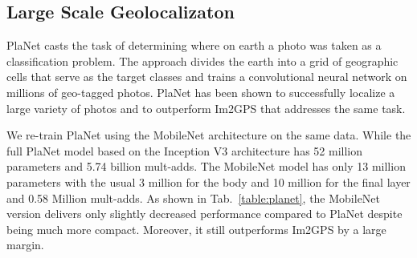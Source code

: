 \documentclass[10pt,twocolumn,letterpaper]{article}
\begin{document}
\subsection{Large Scale Geolocalizaton}
%
\begin{table}[t]
\setlength\tabcolsep{3pt}
  \caption{Performance of PlaNet using the MobileNet architecture. Percentages are the fraction of the Im2GPS test dataset that were localized within a certain distance from the ground truth. The numbers for the original PlaNet model are based on an updated version that has an improved architecture and training dataset.} %
\centering %
\end{table}
%
PlaNet \cite{weyand2016planet} casts the task of determining where on earth a photo was taken as a classification problem. The approach divides the earth into a grid of geographic cells that serve as the target classes and trains a convolutional neural network on millions of geo-tagged photos. PlaNet has been shown to successfully localize a large variety of photos and to outperform Im2GPS \cite{hays2008im2gps,hays2014large} that addresses the same task.

We re-train PlaNet using the MobileNet architecture on the same data. While the full PlaNet model based on the Inception V3 architecture \cite{szegedy2015rethinking} has 52 million parameters and 5.74 billion mult-adds. The MobileNet model has only 13 million parameters with the usual 3 million for the body and 10 million for the final layer and 0.58 Million mult-adds. As shown in Tab.~\ref{table:planet}, the MobileNet version delivers only slightly decreased performance compared to PlaNet despite being much more compact. Moreover, it still outperforms Im2GPS by a large margin.
\end{document}

